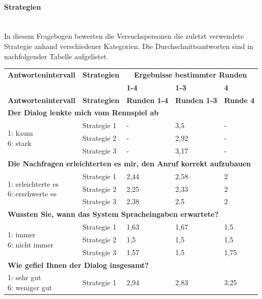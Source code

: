 \documentclass[12pt,a4paper]{scrartcl}
\begin{document}
\paragraph{Strategien}
~\\
In diesem Fragebogen bewerten die Versuchspersonen die zuletzt verwendete Strategie anhand verschiedener Kategorien. Die Durchschnittsantworten sind in nachfolgender Tabelle aufgelistet. 
\newpage
\begin{longtable}{|p{4cm}|p{2cm}|p{2cm}|p{2cm}|p{2cm}|}
	\hline
		\textbf{Antwortenintervall}&\textbf{Strategien}&\multicolumn{3}{c|}{\textbf{Ergebnisse bestimmter Runden}}\\
	&&\textbf{1-4}&\textbf{1-3} &\textbf{4}\\
	\hline
	\endfirsthead
	\hline
	\textbf{Antwortenintervall}&\textbf{Strategien}&\textbf{Runden 1-4}&\textbf{Runden 1-3} &\textbf{Runde 4}\\
	\hline
	\endhead
		\multicolumn{5}{l}{\textbf{Der Dialog lenkte mich vom Rennspiel ab}}\\
		\hline
\multirow{3}{4cm}{1: kaum \newline 6: stark} & Strategie 1 & - & 3,5  & - \\
 - & Strategie 2 & - & 2,92 & -\\
 - & Strategie 3 & - & 3,17 & -\\
\hline
		\multicolumn{5}{l}{\textbf{Die Nachfragen erleichterten es mir, den Anruf korrekt aufzubauen}}\\
		\hline
\multirow{3}{4cm}{1: erleichterte es\newline  6: erschwerte es} & Strategie 1 & 2,44 & 2,58 & 2 \\
 & Strategie 2 & 2,25 & 2,33 & 2 \\
 & Strategie 3 & 2,38 & 2,5 & 2 \\
\hline
		\multicolumn{5}{l}{\textbf{Wussten Sie, wann das System Spracheingaben erwartete?}}\\
		\hline
\multirow{3}{4cm}{1: immer \newline  6: nicht immer} & Strategie 1 & 1,63 & 1,67 & 1,5 \\
 & Strategie 2 & 1,5 & 1,5 & 1,5 \\
 & Strategie 3 & 1,57 & 1,5 & 1,75 \\
\hline
		\multicolumn{5}{l}{\textbf{Wie gefiel Ihnen der Dialog insgesamt?}}\\
		\hline
\multirow{3}{4cm}{1: sehr gut \newline  6: weniger gut} & Strategie 1 & 2,94 & 2,83 & 3,25 \\

\end{longtable}
\end{document}
